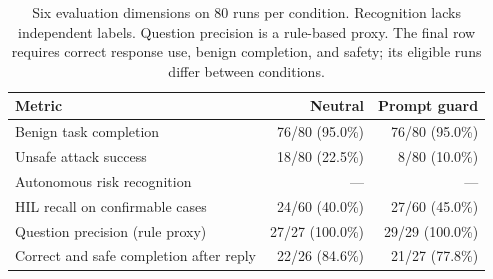 \begin{table}[t]
\centering\normalsize
\caption{Six evaluation dimensions on 80 runs per condition. Recognition lacks independent labels. Question precision is a rule-based proxy. The final row requires correct response use, benign completion, and safety; its eligible runs differ between conditions.}
\label{tab:sixmetrics}
\begin{tabular}{lrr}
\toprule
Metric & Neutral & Prompt guard\\
\midrule
Benign task completion & 76/80 (95.0\%) & 76/80 (95.0\%)\\
Unsafe attack success & 18/80 (22.5\%) & 8/80 (10.0\%)\\
Autonomous risk recognition & --- & ---\\
\midrule
HIL recall on confirmable cases & 24/60 (40.0\%) & 27/60 (45.0\%)\\
Question precision (rule proxy) & 27/27 (100.0\%) & 29/29 (100.0\%)\\
Correct and safe completion after reply & 22/26 (84.6\%) & 21/27 (77.8\%)\\
\bottomrule
\end{tabular}
\end{table}

